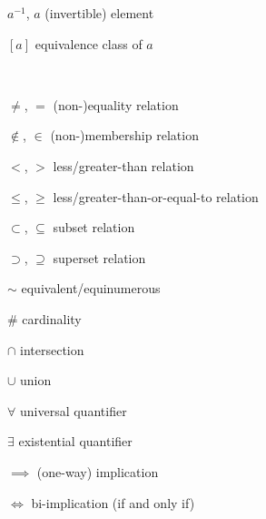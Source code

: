 \documentclass[12pt, oneside]{book}
\begin{document}
\begin{changemargin}{-2cm}{-2cm}
\begin{minipage}[t]{0.6\textwidth}
\medskip

$a^{-1}$, $a$ \hfill (invertible) element\

\medskip

$[a]$ \hfill equivalence class of $a$\

\medskip


\end{minipage}
\begin{minipage}[t]{0.05\textwidth}

${}$\\

\end{minipage}
\begin{minipage}[t]{0.6\textwidth}

$\not =$, $=$ \hfill (non-)equality relation\

\medskip

$\not \in$, $\in$ \hfill (non-)membership relation\

\medskip

$<$, $>$ \hfill less/greater-than relation\

\medskip

$\leq$, $\geq$ \hfill less/greater-than-or-equal-to relation\

\medskip

$\subset$, $\subseteq$ \hfill subset relation\

\medskip

$\supset$, $\supseteq$ \hfill superset relation\ 

\medskip

$\sim$ \hfill equivalent/equinumerous\

\medskip

$\#$ \hfill cardinality\

\medskip

$\cap$ \hfill intersection\

\medskip

$\cup$ \hfill union\

\medskip

$\forall$ \hfill universal quantifier\

\medskip 

$\exists$ \hfill existential quantifier\

\medskip

$\implies$ \hfill  (one-way) implication\

\medskip

$\iff$ \hfill bi-implication (if and only if)\

\medskip


\end{minipage}
\end{changemargin}
\end{document}
